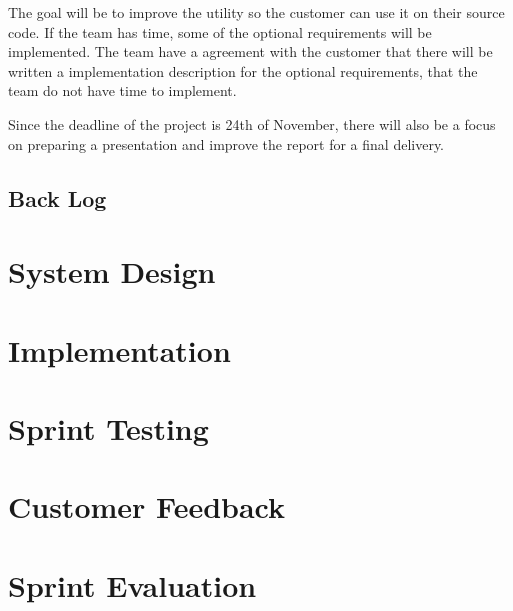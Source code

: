 The goal will be to improve the utility so the customer can use it on their source code. If the team has time, some of the optional requirements will be implemented. The team have a agreement with the customer that there will be written a implementation description for the optional requirements, that the team do not have time to implement.

Since the deadline of the project is 24th of November, there will also be a focus on preparing a presentation and improve the report for a final delivery.

\subsection{Back Log}


\section{System Design}


\section{Implementation}


\section{Sprint Testing}


\section{Customer Feedback}


\section{Sprint Evaluation}


